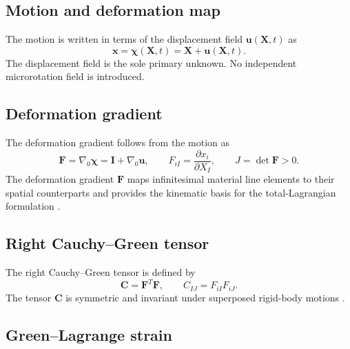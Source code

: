 \documentclass[preprint,12pt]{elsarticle}
\begin{document}
\subsection{Motion and deformation map}
\label{sec:motion-deformation-map}

The motion is written in terms of the displacement field
$\mathbf{u}(\mathbf{X},t)$ as
\begin{equation}
 \mathbf{x}=\boldsymbol{\chi}(\mathbf{X},t)
 =\mathbf{X}+\mathbf{u}(\mathbf{X},t).
 \label{eq:motion-map}
\end{equation}
The displacement field is the sole primary unknown. No independent
microrotation field is introduced.

\subsection{Deformation gradient}
\label{sec:deformation-gradient}

The deformation gradient follows from the motion as
\begin{equation}
 \mathbf{F}=\nabla_0\boldsymbol{\chi}
 =\mathbf{I}+\nabla_0\mathbf{u},
 \qquad
 F_{iI}=\frac{\partial x_i}{\partial X_I},
 \qquad
 J=\det\mathbf{F}>0.
 \label{eq:deformation-gradient}
\end{equation}
The deformation gradient $\mathbf{F}$ maps infinitesimal material line
elements to their spatial counterparts and provides the kinematic basis for
the total-Lagrangian formulation \cite{Holzapfel2000,BonetWood2008}.

\subsection{Right Cauchy--Green tensor}
\label{sec:right-cauchy-green}

The right Cauchy--Green tensor is defined by
\begin{equation}
 \mathbf{C}=\mathbf{F}^{T}\mathbf{F},
 \qquad
 C_{IJ}=F_{iI}F_{iJ}.
 \label{eq:right-cauchy-green}
\end{equation}
The tensor $\mathbf{C}$ is symmetric and invariant under superposed rigid-body
motions \cite{Holzapfel2000,Ogden1997}.

\subsection{Green--Lagrange strain}
\label{sec:green-lagrange-strain}
\end{document}
